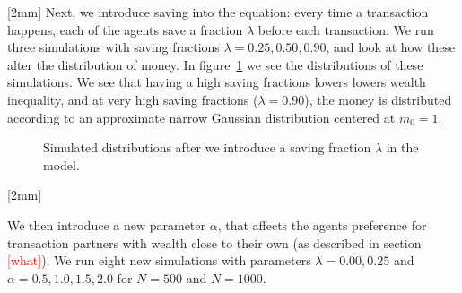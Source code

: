 \documentclass[12pt,a4paper]{article}
\newcommand\oppg[1]{\reversemarginnote{\textcolor{black!40}{#1)}}[2mm]}
\newcommand\comment[1]{\textcolor{red}{[#1]}}
\begin{document}
\clearpage
\oppg{c}
Next, we introduce saving into the equation: every time a transaction happens, each of the agents save a fraction $\lambda$ before each transaction. We run three simulations with saving fractions $\lambda = 0.25, 0.50, 0.90$, and look at how these alter the distribution of money. In figure~\ref{fig:c} we see the distributions of these simulations. We see that having a high saving fractions lowers lowers wealth inequality, and at very high saving fractions ($\lambda = 0.90$), the money is distributed according to an approximate narrow Gaussian distribution centered at $m_0 = 1$.

\begin{figure}[!ht]
  \centering

  \caption{Simulated distributions after we introduce a saving fraction $\lambda$ in the model.} \label{fig:c}
\end{figure}

\oppg{d}

We then introduce a new parameter $\alpha$, that affects the agents preference for transaction partners with wealth close to their own (as described in section \comment{what}). We run eight new simulations with parameters $\lambda = 0.00,0.25$ and $\alpha = 0.5,1.0,1.5,2.0$ for $N = 500$ and $N = 1000$.
\end{document}
